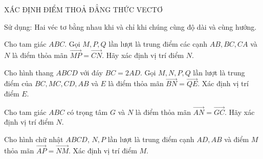 \begin{dang}{XÁC ĐỊNH ĐIỂM THOẢ ĐẲNG THỨC VECTƠ}
    \begin{pp}
        \item Sử dụng: Hai véc tơ bằng nhau khi và chỉ khi chúng cùng độ dài và cùng hướng.
    \end{pp}

    \begin{vd}
        Cho tam giác $ABC$. Gọi $M, P, Q$ lần lượt là trung điểm các cạnh $AB, BC, CA$ và $N$ là điểm thỏa mãn $\vec{MP} = \vec{CN}$. Hãy xác định vị trí điểm $N$.
    \end{vd}

    \begin{vd}
        Cho hình thang $ABCD$ với đáy $BC = 2AD$. Gọi $M,N,P,Q$ lần lượt là trung điểm của $BC,MC, CD, AB$ và $E$ là điểm thỏa mãn $\vec{BN} = \vec{QE}$. Xác định vị trí điểm $E$.
    \end{vd}

    \begin{vd}
        Cho tam giác $ABC$ có trọng tâm $G$ và $N$ là điểm thỏa mãn $\vec{AN} = \vec{GC}$. Hãy xác định vị trí điểm $N$.
    \end{vd}

    \begin{vd}
        Cho hình chữ nhật $ABCD$, $N, P$ lần lượt là trung điểm cạnh $AD, AB$ và điểm $M$ thỏa mãn $\vec{AP} = \vec{NM}$. Xác định vị trí điểm $M$.
    \end{vd}


\end{dang}
